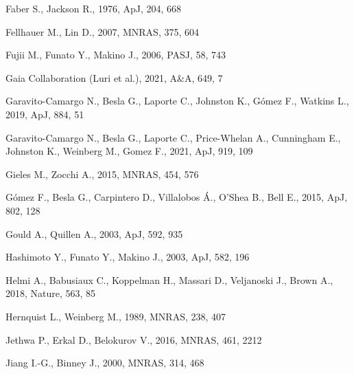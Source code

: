 \documentclass[twocolumn]{aastex63}
\begin{document}
\begin{thebibliography}{}
Faber S., Jackson R., 1976, ApJ, 204, 668

Fellhauer M., Lin D., 2007, MNRAS, 375, 604

Fujii M., Funato Y., Makino J., 2006, PASJ, 58, 743

Gaia Collaboration (Luri et al.), 2021, A\&A, 649, 7

Garavito-Camargo N., Besla G., Laporte C., Johnston K., G{\'o}mez F., Watkins L., 2019, ApJ, 884, 51

Garavito-Camargo N., Besla G., Laporte C., Price-Whelan A., Cunningham E., Johnston K., Weinberg M., Gomez F., 2021, ApJ, 919, 109

Gieles M., Zocchi A., 2015, MNRAS, 454, 576

G\'omez F., Besla G., Carpintero D., Villalobos \'A., O'Shea B., Bell E., 2015, ApJ, 802, 128

Gould A., Quillen A., 2003, ApJ, 592, 935

Hashimoto Y., Funato Y., Makino J., 2003, ApJ, 582, 196

Helmi A., Babusiaux C., Koppelman H., Massari D., Veljanoski J., Brown A., 2018, Nature, 563, 85

Hernquist L., Weinberg M., 1989, MNRAS, 238, 407

Jethwa P., Erkal D., Belokurov V., 2016, MNRAS, 461, 2212

Jiang I.-G., Binney J., 2000, MNRAS, 314, 468


\end{thebibliography}
\end{document}
